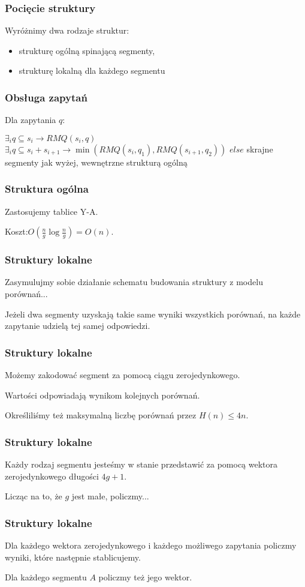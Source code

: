 \documentclass{beamer}
\begin{document}
\begin{frame} \frametitle{Pocięcie struktury}
 Wyróżnimy dwa rodzaje struktur:
 \begin{itemize}
  \item strukturę ogólną spinającą segmenty,
  \item strukturę lokalną dla każdego segmentu
 \end{itemize}
\end{frame}

\begin{frame} \frametitle{Obsługa zapytań}
 Dla zapytania $q$:
 
 $\exists_i q \subseteq s_i \rightarrow RMQ(s_i, q)$\linebreak
 $\exists_i q \subseteq s_i + s_{i+1} \rightarrow \min (RMQ(s_i, q_1), RMQ(s_{i+1}, q_2))$\linebreak
 $else$ skrajne segmenty jak wyżej, wewnętrzne strukturą ogólną
\end{frame}

\begin{frame} \frametitle{Struktura ogólna}
 Zastosujemy tablice Y-A.
 
 Koszt:$O(\frac{n}{g} \log \frac{n}{g}) = O(n)$.
\end{frame}

\begin{frame} \frametitle{Struktury lokalne}
 Zasymulujmy sobie działanie schematu budowania struktury z modelu porównań...
 
 Jeżeli dwa segmenty uzyskają takie same wyniki wszystkich porównań, na każde zapytanie udzielą tej samej odpowiedzi.
\end{frame}

\begin{frame} \frametitle{Struktury lokalne}
 Możemy zakodować segment za pomocą ciągu zerojedynkowego.
 
 Wartości odpowiadają wynikom kolejnych porównań.
 
 Określiliśmy też maksymalną liczbę porównań przez $H(n) \leq 4n$.
\end{frame}

\begin{frame} \frametitle{Struktury lokalne}
 Każdy rodzaj segmentu jesteśmy w stanie przedstawić za pomocą wektora zerojedynkowego długości $4g + 1$.
 
 Licząc na to, że $g$ jest małe, policzmy...
\end{frame}

\begin{frame} \frametitle{Struktury lokalne}
 Dla każdego wektora zerojedynkowego i każdego możliwego zapytania policzmy wyniki, które następnie stablicujemy.
 
 Dla każdego segmentu $A$ policzmy też jego wektor.
\end{frame}
\end{document}
